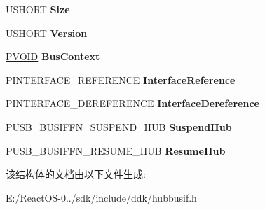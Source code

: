 \begin{DoxyCompactItemize}
\item 
\mbox{\label{struct___u_s_b___b_u_s___i_n_t_e_r_f_a_c_e___h_u_b___s_e_l_e_c_t_i_v_e___s_u_s_p_e_n_d_ab08386574d227dab9cc9b4d437515a0f}} 
U\+S\+H\+O\+RT {\bfseries Size}
\item 
\mbox{\label{struct___u_s_b___b_u_s___i_n_t_e_r_f_a_c_e___h_u_b___s_e_l_e_c_t_i_v_e___s_u_s_p_e_n_d_ae9f90dedc1d296824562ee2cfcb600bf}} 
U\+S\+H\+O\+RT {\bfseries Version}
\item 
\mbox{\label{struct___u_s_b___b_u_s___i_n_t_e_r_f_a_c_e___h_u_b___s_e_l_e_c_t_i_v_e___s_u_s_p_e_n_d_a65e777ba88004279695187806f3e0cac}} 
\hyperlink{interfacevoid}{P\+V\+O\+ID} {\bfseries Bus\+Context}
\item 
\mbox{\label{struct___u_s_b___b_u_s___i_n_t_e_r_f_a_c_e___h_u_b___s_e_l_e_c_t_i_v_e___s_u_s_p_e_n_d_acf65e91c6211aed637ab79512c4a976a}} 
P\+I\+N\+T\+E\+R\+F\+A\+C\+E\+\_\+\+R\+E\+F\+E\+R\+E\+N\+CE {\bfseries Interface\+Reference}
\item 
\mbox{\label{struct___u_s_b___b_u_s___i_n_t_e_r_f_a_c_e___h_u_b___s_e_l_e_c_t_i_v_e___s_u_s_p_e_n_d_a9765a4bf8721b91df622f3f3e9e1bca4}} 
P\+I\+N\+T\+E\+R\+F\+A\+C\+E\+\_\+\+D\+E\+R\+E\+F\+E\+R\+E\+N\+CE {\bfseries Interface\+Dereference}
\item 
\mbox{\label{struct___u_s_b___b_u_s___i_n_t_e_r_f_a_c_e___h_u_b___s_e_l_e_c_t_i_v_e___s_u_s_p_e_n_d_a0b24a92e6aadd6e35342ec5e00b6932f}} 
P\+U\+S\+B\+\_\+\+B\+U\+S\+I\+F\+F\+N\+\_\+\+S\+U\+S\+P\+E\+N\+D\+\_\+\+H\+UB {\bfseries Suspend\+Hub}
\item 
\mbox{\label{struct___u_s_b___b_u_s___i_n_t_e_r_f_a_c_e___h_u_b___s_e_l_e_c_t_i_v_e___s_u_s_p_e_n_d_a7ab86353bd8cd5bbd1a713b00dc2ab35}} 
P\+U\+S\+B\+\_\+\+B\+U\+S\+I\+F\+F\+N\+\_\+\+R\+E\+S\+U\+M\+E\+\_\+\+H\+UB {\bfseries Resume\+Hub}
\end{DoxyCompactItemize}


该结构体的文档由以下文件生成\+:\begin{DoxyCompactItemize}
\item 
E\+:/\+React\+O\+S-\/0../sdk/include/ddk/hubbusif.\+h\end{DoxyCompactItemize}
